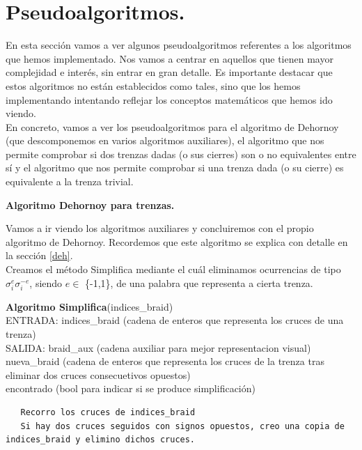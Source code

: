 \newpage
\section{Pseudoalgoritmos.}
En esta sección vamos a ver algunos pseudoalgoritmos referentes a los algoritmos que hemos implementado. Nos vamos a centrar en aquellos que tienen mayor complejidad e interés, sin entrar en gran detalle. Es importante destacar que estos algoritmos no están establecidos como tales, sino que los hemos implementando intentando reflejar los conceptos matemáticos que hemos ido viendo. \\

En concreto, vamos a ver los pseudoalgoritmos para el algoritmo de Dehornoy (que descomponemos en varios algoritmos auxiliares), el algoritmo que nos permite comprobar si dos trenzas dadas (o sus cierres) son o no equivalentes entre sí y el algoritmo que nos permite comprobar si una trenza dada (o su cierre) es equivalente a la trenza trivial.\\

\begin{center}
	\textbf{Algoritmo Dehornoy para trenzas.}
\end{center} 
Vamos a ir viendo los algoritmos auxiliares y concluiremos con el propio algoritmo de Dehornoy. Recordemos que este algoritmo se explica con detalle en la sección \ref{deh}.\\

Creamos el método Simplifica mediante el cuál eliminamos ocurrencias de tipo $\sigma_{i}^{e}\sigma_{i}^{-e}$, siendo $ e \in$ \{-1,1\}, de una palabra que representa a cierta trenza. 

\begin{alg}
	\textbf{Algoritmo Simplifica}(indices\_braid)\\
	ENTRADA: indices\_braid (cadena de enteros que representa los cruces de una trenza)\\
	SALIDA: \hspace{0.4cm} braid\_aux (cadena auxiliar para mejor representacion visual) \\
    \hspace*{2.2cm} nueva\_braid (cadena de enteros que representa los cruces de la trenza tras eliminar dos cruces consecuetivos opuestos)\\
    \hspace*{2.2cm} encontrado (bool para indicar si se produce simplificación)
	
\begin{lstlisting}
   Recorro los cruces de indices_braid
   Si hay dos cruces seguidos con signos opuestos, creo una copia de indices_braid y elimino dichos cruces. 
\end{lstlisting}
\end{alg}

